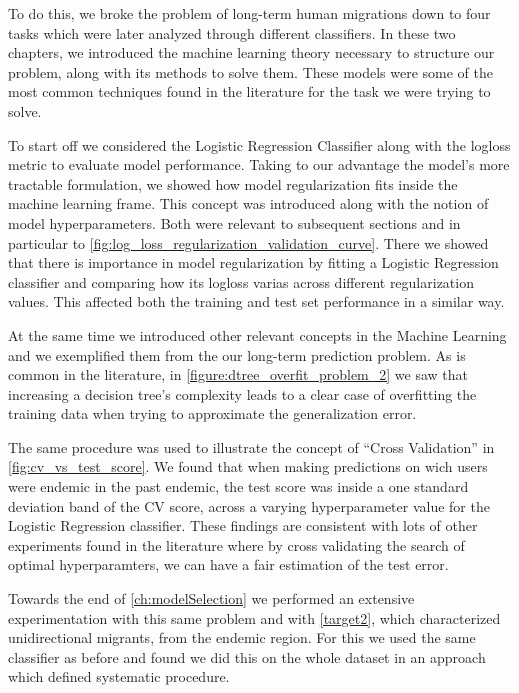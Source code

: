 To do this, we broke the problem of long-term human migrations down to four tasks which were later analyzed through different classifiers.
In these two chapters, we introduced the machine learning theory necessary to structure our problem, along with its methods to solve them.
These models were some of the most common techniques found in the literature for the task we were trying to solve.

To start off we considered the Logistic Regression Classifier along with the logloss metric to evaluate model performance.
Taking to our advantage the model's more tractable formulation, we showed how model regularization fits inside the machine learning frame.
This concept was introduced along with the notion of model hyperparameters.
Both were relevant to subsequent sections and in particular to \cref{fig:log_loss_regularization_validation_curve}.
There we showed that there is importance in model regularization by fitting a Logistic Regression classifier and comparing how its logloss varias across different regularization values.
This affected both the training and test set performance in a similar way.


At the same time we introduced other relevant concepts in the Machine Learning and we exemplified them from the our long-term prediction problem.
As is common in the literature, in \cref{figure:dtree_overfit_problem_2} we saw that increasing a decision tree's complexity leads to a clear case of overfitting the training data when trying to approximate the generalization error.

The same procedure was used to illustrate the concept of ``Cross Validation'' in \cref{fig:cv_vs_test_score}.
We found that when making predictions on wich users were endemic in the past endemic, the test score was inside a one standard deviation band of the CV score, across a varying hyperparameter value for the Logistic Regression classifier.
These findings are consistent with lots of other experiments found in the literature where by cross validating the search of optimal hyperparamters, we can have a fair estimation of the test error. 


Towards the end of \cref{ch:modelSelection} we performed an extensive experimentation with this same problem and with \cref{target2}, which characterized unidirectional migrants, from the endemic region. 
For this we used the same classifier as before and found we did this on the whole dataset in an approach which defined systematic procedure.


